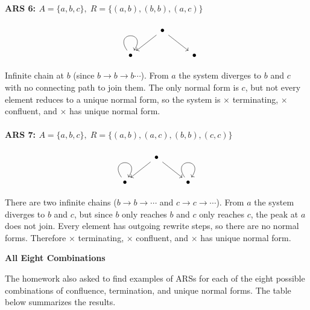 \documentclass{article}
\theoremstyle{theorem}
\theoremstyle{definition}
\theoremstyle{remark}
\begin{document}
\paragraph{ARS 6: $A=\{a,b,c\},\; R=\{(a,b),(b,b),(a,c)\}$}

\[
\begin{tikzcd}
	& \bullet \\
	\bullet && \bullet
	\arrow[from=1-2, to=2-1]
	\arrow[from=1-2, to=2-3]
	\arrow[from=2-1, to=2-1, loop, in=55, out=125, distance=10mm]
\end{tikzcd}
\]

Infinite chain at $b$ (since $b \to b \to b \cdots$). From $a$ the system diverges to $b$ and $c$ with no connecting path to join them. The only normal form is $c$, but not every element reduces to a unique normal form, so the system is $\times$ terminating, $\times$ confluent, and $\times$ has unique normal form.

\paragraph{ARS 7: $A=\{a,b,c\},\; R=\{(a,b),(a,c),(b,b),(c,c)\}$}

\[
\begin{tikzcd}
	& \bullet \\
	\bullet && \bullet
	\arrow[from=1-2, to=2-1]
	\arrow[from=1-2, to=2-3]
	\arrow[from=2-1, to=2-1, loop, in=55, out=125, distance=10mm]
	\arrow[from=2-3, to=2-3, loop, in=55, out=125, distance=10mm]
\end{tikzcd}
\]

There are two infinite chains ($b \to b \to \cdots$ and $c \to c \to \cdots$). 
From $a$ the system diverges to $b$ and $c$, but since $b$ only reaches $b$ and $c$ only reaches $c$, 
the peak at $a$ does not join. Every element has outgoing rewrite steps, so there are no normal forms. 
Therefore $\times$ terminating, $\times$ confluent, and $\times$ has unique normal form.

\textbf{All Eight Combinations}

The homework also asked to find examples of ARSs for each of the eight possible
combinations of confluence, termination, and unique normal forms. 
The table below summarizes the results.
\end{document}
